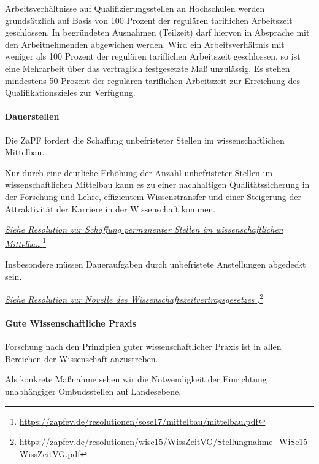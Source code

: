 \documentclass[DIV=calc]{scrartcl}
\begin{document}
Arbeitsverhältnisse auf Qualifizierungsstellen an Hochschulen werden grundsätzlich auf Basis von 100 Prozent der regulären tariflichen Arbeitszeit geschlossen. In begründeten Ausnahmen (Teilzeit) darf hiervon in Absprache mit den Arbeitnehmenden abgewichen werden. Wird ein Arbeitsverhältnis mit weniger als 100 Prozent der regulären tariflichen Arbeitszeit geschlossen, so ist eine Mehrarbeit über das vertraglich festgesetzte Maß unzulässig. Es stehen mindestens 50 Prozent der regulären tariflichen Arbeitszeit zur Erreichung des Qualifikationszieles zur Verfügung.

\hypertarget{dauerstellen}{%
\paragraph{Dauerstellen}\label{dauerstellen}}
Die ZaPF fordert die Schaffung unbefristeter Stellen im wissenschaftlichen Mittelbau.

Nur durch eine deutliche Erhöhung der Anzahl unbefristeter Stellen im wissenschaftlichen Mittelbau kann es zu einer nachhaltigen Qualitätssicherung in der Forschung und Lehre, effizientem Wissenstransfer und einer Steigerung der Attraktivität der Karriere in der Wissenschaft kommen.

\href{https://zapfev.de/resolutionen/sose17/mittelbau/mittelbau.pdf}{\emph{Siehe Resolution zur Schaffung permanenter
    Stellen im wissenschaftlichen Mittelbau%
  }}\footnote{\url{https://zapfev.de/resolutionen/sose17/mittelbau/mittelbau.pdf}}

Insbesondere müssen Daueraufgaben durch unbefristete Anstellungen abgedeckt sein.

\href{https://zapfev.de/resolutionen/wise15/WissZeitVG/Stellungnahme_WiSe15_WissZeitVG.pdf}{\emph{Siehe Resolution zur Novelle des Wissenschaftszeitvertragsgesetzes%
  }}.\footnote{\url{https://zapfev.de/resolutionen/wise15/WissZeitVG/Stellungnahme_WiSe15_WissZeitVG.pdf}}

\hypertarget{gute-wissenschaftliche-praxis}{%
\paragraph{Gute Wissenschaftliche Praxis}\label{gute-wissenschaftliche-praxis}}
Forschung nach den Prinzipien guter wissenschaftlicher Praxis ist in allen Bereichen der Wissenschaft anzustreben.

Als konkrete Maßnahme sehen wir die Notwendigkeit der Einrichtung unabhängiger Ombudsstellen auf Landesebene.
\end{document}
